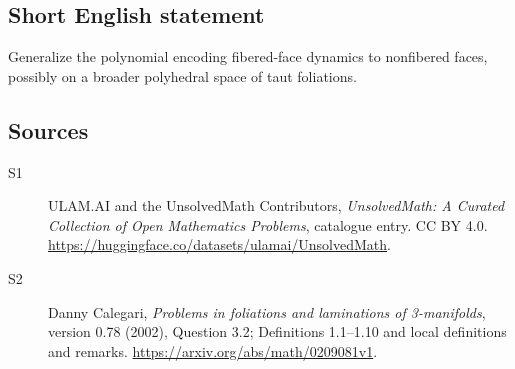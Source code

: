 \documentclass[11pt]{article}
\begin{document}
\subsection{Short English statement}
Generalize the polynomial encoding fibered-face dynamics to nonfibered faces, possibly on a broader polyhedral space of taut foliations.
\subsection{Sources}
\begin{description}
\item[\hypertarget{source:statement:1}{S1}] ULAM.AI and the UnsolvedMath Contributors, \emph{UnsolvedMath: A Curated Collection of Open Mathematics Problems}, catalogue entry. CC BY 4.0. \url{https://huggingface.co/datasets/ulamai/UnsolvedMath}.
\item[\hypertarget{source:statement:2}{S2}] Danny Calegari, \emph{Problems in foliations and laminations of 3-manifolds}, version 0.78 (2002), Question 3.2; Definitions 1.1--1.10 and local definitions and remarks. \url{https://arxiv.org/abs/math/0209081v1}.
\end{description}
\label{end:statement}
\end{document}
